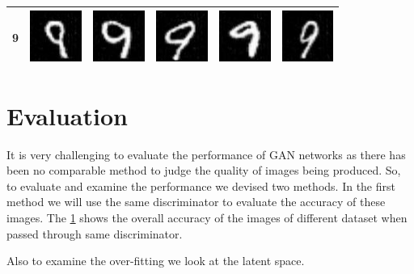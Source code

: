 \begin{table}[ht]
\begin{tabular}{|llllll|}
9 & \includegraphics[width=1.69cm, height=1.69cm]{Files/MNIST/1-1.png}  &\includegraphics[width=1.69cm, height=1.69cm]{Files/MNIST/2-3.png}   & \includegraphics[width=1.69cm, height=1.69cm]{Files/MNIST/4-7.png}  & \includegraphics[width=1.69cm, height=1.69cm]{Files/MNIST/6-1.png}  & \includegraphics[width=1.69cm, height=1.69cm]{Files/MNIST/7-3.png} \\ \hline

\end{tabular}
\end{table}



\section{Evaluation}

It is very challenging to evaluate the performance of GAN networks as there has been no comparable method to judge the quality of images being produced. So, to evaluate and examine the performance we devised two methods. In the first method we will use the same discriminator to evaluate the accuracy of these images. The \cref{} shows the overall accuracy of the images of different dataset when passed through same discriminator.  


Also to examine the over-fitting we look at the latent space. 